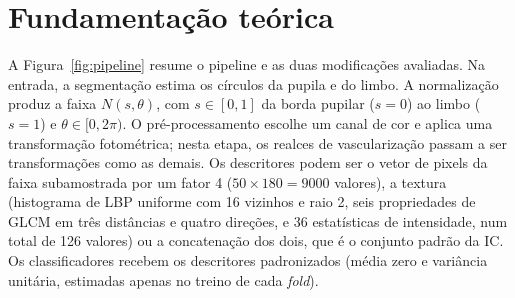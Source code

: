 \chapter{Fundamentação teórica}
\label{cap:fundamentacao}


A Figura~\ref{fig:pipeline} resume o pipeline e as duas modificações
avaliadas. Na entrada, a segmentação estima os círculos da pupila e do limbo.
A normalização produz a faixa $N(s,\theta)$, com $s\in[0,1]$ da borda pupilar
($s=0$) ao limbo ($s=1$) e $\theta\in[0,2\pi)$. O pré-processamento escolhe um
canal de cor e aplica uma transformação fotométrica; nesta etapa, os realces
de vascularização passam a ser transformações como as demais. Os descritores
podem ser o vetor de pixels da faixa subamostrada por um fator 4
($50\times180=9000$ valores), a textura (histograma de LBP uniforme com 16
vizinhos e raio 2, seis propriedades de GLCM em três distâncias e quatro
direções, e 36 estatísticas de intensidade, num total de 126 valores) ou a
concatenação dos dois, que é o conjunto padrão da IC. Os classificadores
recebem os descritores padronizados (média zero e variância unitária,
estimadas apenas no treino de cada \emph{fold}).

